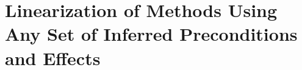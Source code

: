 \documentclass[letterpaper]{article} %
\newcommand{\PreS} {\ensuremath{\mathit{pre^{*}}}}
\newcommand{\AddS} {\ensuremath{\mathit{add^{*}}}}
\newcommand{\DelS} {\ensuremath{\mathit{del^{*}}}}
\newcommand{\singlePrec} {\ensuremath{\mathit{ \mathord{\prec} }}}
\begin{document}



\section{Linearization of Methods Using Any Set of Inferred Preconditions and Effects}

	
		
\end{document}

